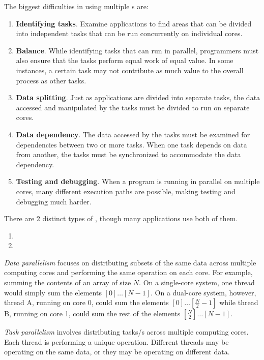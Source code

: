 The biggest difficulties in using multiple s are:
\begin{enumerate}[noitemsep]
\item \textbf{Identifying tasks}.
  Examine applications to find areas that can be divided into independent tasks that can be run concurrently on individual cores.
\item \textbf{Balance}.
  While identifying tasks that can run in parallel, programmers must also ensure that the tasks perform equal work of equal value.
  In some instances, a certain task may not contribute as much value to the overall process as other tasks.
\item \textbf{Data splitting}.
  Just as applications are divided into separate tasks, the data accessed and manipulated by the tasks must be divided to run on separate cores.
\item \textbf{Data dependency}.
  The data accessed by the tasks must be examined for dependencies between two or more tasks.
  When one task depends on data from another, the tasks must be synchronized to accommodate the data dependency.
\item \textbf{Testing and debugging}.
  When a program is running in parallel on multiple cores, many different execution paths are possible, making testing and debugging much harder.
\end{enumerate}

There are 2 distinct types of , though many applications use both of them.
\begin{enumerate}[noitemsep]
\item {}
\item {}
\end{enumerate}

\begin{definition}\label{def:Data_Parallelism}
  \emph{Data parallelism} focuses on distributing subsets of the same data across multiple computing cores and performing the same operation on each core.
  For example, summing the contents of an array of size $N$.
  On a single-core system, one thread would simply sum the elements $[0] \ldots [N − 1]$.
  On a dual-core system, however, thread A, running on core 0, could sum the elements $[0] \ldots [\frac{N}{2} − 1]$ while thread B, running on core 1, could sum the rest of the elements $[\frac{N}{2}] \ldots [N − 1]$.
\end{definition}

\begin{definition}\label{def:Task_Parallelism}
  \emph{Task parallelism} involves distributing tasks/s across multiple computing cores.
  Each thread is performing a unique operation.
  Different threads may be operating on the same data, or they may be operating on different data.
\end{definition}


